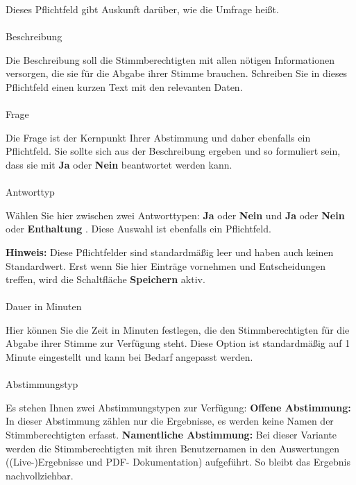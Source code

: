 \documentclass[
  letterpaper,
  DIV=11,
  numbers=noendperiod]{scrreprt}
\makeatletter
\let\oldparagraph\paragraph
\renewcommand{\paragraph}{
    \@ifstar
      \xxxParagraphStar
      \xxxParagraphNoStar
  }
\newcommand{\xxxParagraphStar}[1]{\oldparagraph*{#1}\mbox{}}
\newcommand{\xxxParagraphNoStar}[1]{\oldparagraph{#1}\mbox{}}
\makeatother
\begin{document}
Dieses Pflichtfeld gibt Auskunft darüber, wie die Umfrage heißt.

\paragraph{Beschreibung}\label{beschreibung}

Die Beschreibung soll die Stimmberechtigten mit allen nötigen
Informationen versorgen, die sie für die Abgabe ihrer Stimme brauchen.
Schreiben Sie in dieses Pflichtfeld einen kurzen Text mit den relevanten
Daten.

\paragraph{Frage}\label{frage}

Die Frage ist der Kernpunkt Ihrer Abstimmung und daher ebenfalls ein
Pflichtfeld. Sie sollte sich aus der Beschreibung ergeben und so
formuliert sein, dass sie mit \textbf{Ja} oder \textbf{Nein} beantwortet
werden kann.

\paragraph{Antworttyp}\label{antworttyp}

Wählen Sie hier zwischen zwei Antworttypen: \textbf{Ja} oder
\textbf{Nein} und \textbf{Ja} oder \textbf{Nein} oder
\textbf{Enthaltung} . Diese Auswahl ist ebenfalls ein Pflichtfeld.

\textbf{Hinweis:} Diese Pflichtfelder sind standardmäßig leer und haben
auch keinen Standardwert. Erst wenn Sie hier Einträge vornehmen und
Entscheidungen treffen, wird die Schaltfläche \textbf{Speichern} aktiv.

\paragraph{Dauer in Minuten}\label{dauer-in-minuten}

Hier können Sie die Zeit in Minuten festlegen, die den Stimmberechtigten
für die Abgabe ihrer Stimme zur Verfügung steht. Diese Option ist
standardmäßig auf 1 Minute eingestellt und kann bei Bedarf angepasst
werden.

\paragraph{Abstimmungstyp}\label{abstimmungstyp}

Es stehen Ihnen zwei Abstimmungstypen zur Verfügung: \textbf{Offene
Abstimmung:} In dieser Abstimmung zählen nur die Ergebnisse, es werden
keine Namen der Stimmberechtigten erfasst. \textbf{Namentliche
Abstimmung:} Bei dieser Variante werden die Stimmberechtigten mit ihren
Benutzernamen in den Auswertungen ((Live-)Ergebnisse und PDF-
Dokumentation) aufgeführt. So bleibt das Ergebnis nachvollziehbar.
\end{document}
